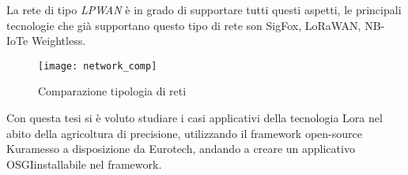 La rete di tipo \emph{LPWAN} è in grado di supportare tutti questi aspetti, le
principali tecnologie che già supportano questo tipo di rete son SigFox\tm,
LoRaWAN\tm, NB-IoT\tm e Weightless\tm. 

\begin{figure}[h]
\centering 
\texttt{[image: network\_comp]}
\caption{Comparazione tipologia di reti}
\end{figure}

Con questa tesi si è voluto studiare i casi applicativi della tecnologia Lora\tm
nel abito della agricoltura di precisione, utilizzando il framework open-source
Kura\tm messo a disposizione da Eurotech\tm, andando a creare un applicativo
OSGI\reg installabile nel framework. 
